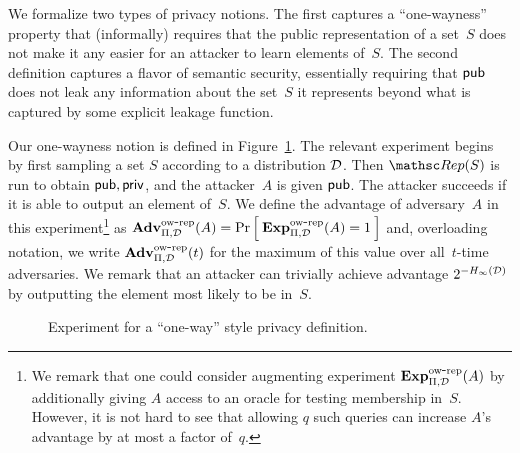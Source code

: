 We formalize two types of privacy notions. The first captures
a ``one-wayness'' property that (informally) requires that
the public representation of a set~$S$ does not make it any easier for an attacker
to learn elements of~$S$.  The second definition
captures a flavor of semantic security, essentially requiring that ${\sf pub}$ does
not leak any information about the set~$S$ it represents beyond
what is captured by some explicit leakage function.

Our one-wayness notion is defined in Figure~\ref{fig:privacy-ow}.
The relevant experiment begins by first sampling a set $S$ according to a distribution
${\cal D}$. Then $\Rep(S)$ is run to obtain ${\sf pub},{\sf priv}$, and the attacker~$A$ is given
${\sf pub}$. The attacker succeeds if it is able to output an element of~$S$.
We define the advantage of adversary~$A$ in this experiment\footnote{We
remark that one could consider augmenting experiment $\mathrm{\mathbf{Exp}}^{\mathrm{ow\mbox{-}rep}}_{\Pi,{\cal D}}(A)$ by additionally
giving $A$ access to an oracle for testing membership in~$S$. However, it is not hard
to see that allowing $q$ such queries can increase $A$'s advantage by at most a factor of~$q$.} as
$\mathrm{\mathbf{Adv}}^{\mathrm{ow\mbox{-}rep}}_{\Pi,\mathcal{D}}(A) = \Pr\left[\: \mathrm{\mathbf{Exp}}^{\mathrm{ow\mbox{-}rep}}_{\Pi,{\cal D}}(A)=1 \:\right]$ and,
overloading notation, we write $\mathrm{\mathbf{Adv}}^{\mathrm{ow\mbox{-}rep}}_{\Pi,{\cal D}}(t)$ for the maximum of this value over
all~$t$-time adversaries.
We remark that an attacker can trivially achieve advantage
$2^{-H_\infty({\cal D})}$ by outputting the element most likely to be in~$S$.

\begin{figure}[tp]
\centering
{}
\caption{Experiment for a ``one-way'' style privacy
  definition.}
\label{fig:privacy-ow}
\end{figure}


